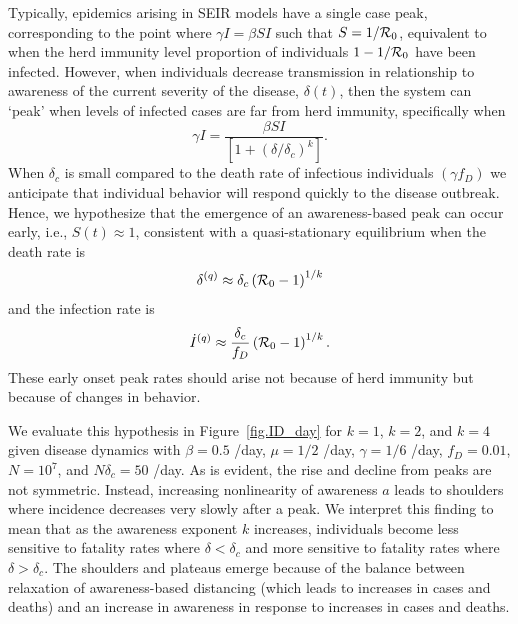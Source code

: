 Typically, epidemics arising in SEIR models have a single case peak, corresponding 
to the point where $\gamma I = \beta S I $ such that 
$S=1/{\cal{R}}_0$, equivalent to when the herd
immunity level proportion of individuals
$1-1/{\cal{R}}_0$ have been infected.
However, when individuals decrease transmission in relationship
to awareness of the current severity of the disease, $\delta(t)$,
then the system can `peak' when levels of infected cases are
far from herd immunity, specifically when
\begin{equation}
\gamma I = \frac{\beta SI}{\left[1+\left(\delta/\delta_c\right)^{k}\right]}.
\end{equation}
When $\delta_c$ is small compared to the death rate of infectious individuals $(\gamma f_D)$ we anticipate that individual behavior will respond quickly to the disease outbreak.
Hence, we hypothesize that the
emergence of an
awareness-based peak can occur early, i.e., $S(t)\approx 1$, consistent
with a quasi-stationary equilibrium when the death rate is
\begin{equation}
\delta^{(q)} \approx \delta_c\left({\cal{R}}_0-1\right)^{1/k}
\end{equation}
and the infection rate is
\begin{equation}
\dot{I}^{(q)} \approx \frac{\delta_c}{f_D}\left({\cal{R}}_0-1\right)^{1/k}.
\end{equation}
These early onset peak rates should arise not because
of herd immunity but because of changes in behavior. 

We evaluate this hypothesis in
Figure~\ref{fig.ID_day} for $k=1$, $k=2$, and $k=4$
given disease dynamics with $\beta=0.5$ /day, $\mu=1/2$ /day, $\gamma=1/6$
/day,
$f_D=0.01$, $N=10^7$, and $N\delta_c=50$ /day.  
As is evident, the rise and decline from peaks are not symmetric. Instead,
increasing nonlinearity of awareness
$a$ leads to shoulders where incidence decreases very slowly after a peak.
We interpret this finding to mean that as the awareness exponent $k$ increases,
individuals become less sensitive to fatality rates
where $\delta < \delta_c$ and more sensitive to fatality rates where $\delta > \delta_c$.  
The shoulders and plateaus emerge because of the balance
between relaxation of awareness-based
distancing (which leads to increases in cases and deaths) and an 
increase in awareness in response to increases in cases and deaths.  

